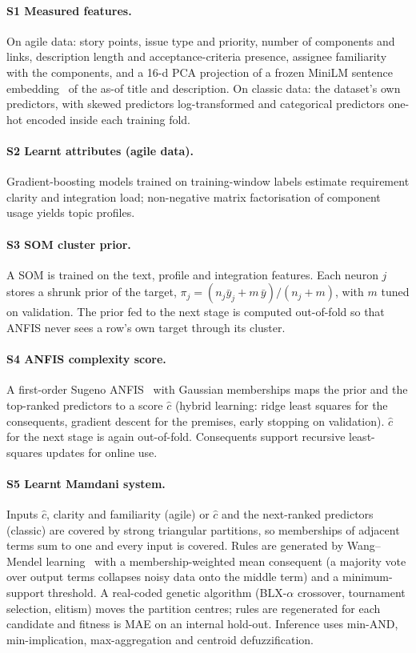 \documentclass[preprint,12pt,authoryear]{elsarticle}
\begin{document}
\paragraph{S1 Measured features.}  On agile data: story points, issue type and priority, number of components and
links, description length and acceptance-criteria presence, assignee familiarity with the components, and a 16-d PCA
projection of a frozen MiniLM sentence embedding~\citep{reimers2019sbert} of the as-of title and description.  On
classic data: the dataset's own predictors, with skewed predictors log-transformed and categorical predictors
one-hot encoded inside each training fold.

\paragraph{S2 Learnt attributes (agile data).}  Gradient-boosting models trained on training-window labels estimate
requirement clarity and integration load; non-negative matrix factorisation of component usage yields topic profiles.

\paragraph{S3 SOM cluster prior.}  A SOM is trained on the text, profile and integration features.  Each neuron $j$
stores a shrunk prior of the target, $\pi_j = (n_j\bar{y}_j + m\,\bar{y})/(n_j+m)$, with $m$ tuned on validation.  The
prior fed to the next stage is computed out-of-fold so that ANFIS never sees a row's own target through its cluster.

\paragraph{S4 ANFIS complexity score.}  A first-order Sugeno ANFIS~\citep{jang1993anfis} with Gaussian memberships
maps the prior and the top-ranked predictors to a score $\hat c$ (hybrid learning: ridge least squares for the
consequents, gradient descent for the premises, early stopping on validation).  $\hat c$ for the next stage is again
out-of-fold.  Consequents support recursive least-squares updates for online use.

\paragraph{S5 Learnt Mamdani system.}  Inputs $\hat c$, clarity and familiarity (agile) or $\hat c$ and the
next-ranked predictors (classic) are covered by strong triangular partitions, so memberships of adjacent terms sum to
one and every input is covered.  Rules are generated by Wang--Mendel learning~\citep{wang1992mendel} with a
membership-weighted mean consequent (a majority vote over output terms collapses noisy data onto the middle term) and
a minimum-support threshold.  A real-coded genetic algorithm (BLX-$\alpha$ crossover, tournament selection, elitism)
moves the partition centres; rules are regenerated for each candidate and fitness is MAE on an internal hold-out.
Inference uses min-AND, min-implication, max-aggregation and centroid defuzzification.
\end{document}
